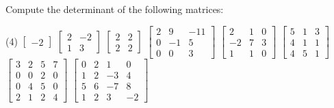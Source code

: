 \begin{exercise}\ansMark%
\pagebreak[2]
Compute the determinant of the following matrices:
\begin{tasks}(4)
\task
$\begin{bmatrix}
-2
\end{bmatrix}$
\task
$\begin{bmatrix}
2 & -2 \\
1 & 3
\end{bmatrix}$
\task
$\begin{bmatrix}
2 & 2 \\
2 & 2
\end{bmatrix}$
\task
$\begin{bmatrix}
2 & 9 & -11 \\
0 & -1 & 5 \\
0 & 0 & 3
\end{bmatrix}$
\task
$\begin{bmatrix}
2 & 1 & 0 \\
-2 & 7 & 3 \\
1 & 1 & 0
\end{bmatrix}$
\task
$\begin{bmatrix}
5 & 1 & 3 \\
4 & 1 & 1 \\
4 & 5 & 1
\end{bmatrix}$
\task
$\begin{bmatrix}
3 & 2 & 5 & 7 \\
0 & 0 & 2 & 0 \\
0 & 4 & 5 & 0 \\
2 & 1 & 2 & 4
\end{bmatrix}$
\task
$\begin{bmatrix}
 0 &  2 &  1 &  0 \\
 1 &  2 & -3 &  4 \\
 5 &  6 & -7 &  8 \\
 1 &  2 &  3 & -2
\end{bmatrix}$
\end{tasks}
\end{exercise}

